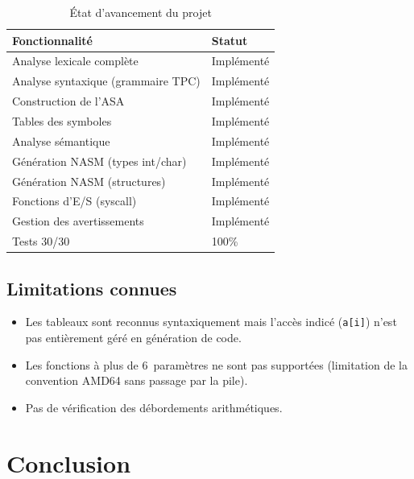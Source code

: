 \documentclass[12pt,a4paper]{article}
\begin{document}
\begin{table}[H]
\centering
\begin{tabularx}{\linewidth}{Xl}
\toprule
\textbf{Fonctionnalité} & \textbf{Statut} \\
\midrule
Analyse lexicale complète          & \textcolor{green!60!black}{Implémenté} \\
Analyse syntaxique (grammaire TPC) & \textcolor{green!60!black}{Implémenté} \\
Construction de l'ASA              & \textcolor{green!60!black}{Implémenté} \\
Tables des symboles                & \textcolor{green!60!black}{Implémenté} \\
Analyse sémantique                 & \textcolor{green!60!black}{Implémenté} \\
Génération NASM (types int/char)   & \textcolor{green!60!black}{Implémenté} \\
Génération NASM (structures)       & \textcolor{green!60!black}{Implémenté} \\
Fonctions d'E/S (syscall)          & \textcolor{green!60!black}{Implémenté} \\
Gestion des avertissements         & \textcolor{green!60!black}{Implémenté} \\
Tests 30/30                        & \textcolor{green!60!black}{100\%} \\
\bottomrule
\end{tabularx}
\caption{État d'avancement du projet}
\end{table}

\subsection{Limitations connues}

\begin{itemize}
  \item Les tableaux sont reconnus syntaxiquement mais l'accès indicé
        (\texttt{a[i]}) n'est pas entièrement géré en génération de code.
  \item Les fonctions à plus de 6~paramètres ne sont pas supportées
        (limitation de la convention AMD64 sans passage par la pile).
  \item Pas de vérification des débordements arithmétiques.
\end{itemize}

\section{Conclusion}
\end{document}
